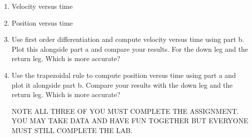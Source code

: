 \begin{enumerate}

\item Velocity versus time

\item Position versus time

\item Use first order differentiation and compute velocity versus time
  using part b. Plot this alongside part a and compare your
  results. For the down leg and the return leg. Which is more
  accurate? 

\item Use the trapezoidal rule to compute position versus time using
  part a and plot it alongside part b. Compare your results with the
  down leg and the return leg. Which is more accurate? 

NOTE ALL THREE OF YOU MUST COMPLETE THE ASSIGNMENT. YOU MAY
TAKE DATA AND HAVE FUN TOGETHER BUT EVERYONE MUST STILL COMPLETE THE
LAB.  

\end{enumerate}

